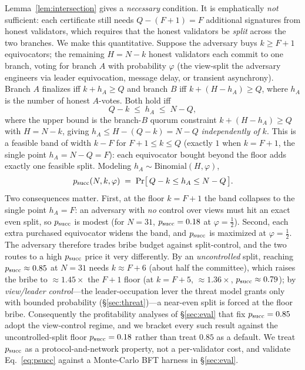 Lemma~\ref{lem:intersection} gives a \emph{necessary} condition. It is emphatically \emph{not}
sufficient: each certificate still needs $Q-(F{+}1)=F$ additional signatures from honest validators,
which requires that the honest validators be \emph{split} across the two branches. We make this
quantitative. Suppose the adversary buys $k\ge F+1$ equivocators; the remaining $H=N-k$ honest
validators each commit to one branch, voting for branch $A$ with probability $\varphi$ (the
view-split the adversary engineers via leader equivocation, message delay, or transient asynchrony).
Branch $A$ finalizes iff $k+h_A\ge Q$ and branch $B$ iff $k+(H-h_A)\ge Q$, where $h_A$ is the number
of honest $A$-votes. Both hold iff
\begin{equation}
Q-k \;\le\; h_A \;\le\; N-Q,
\label{eq:band}
\end{equation}
where the upper bound is the branch-$B$ quorum constraint $k+(H-h_A)\ge Q$ with $H=N-k$, giving
$h_A\le H-(Q{-}k)=N-Q$ \emph{independently of} $k$. This is a feasible band of width $k-F$ for
$F{+}1\le k\le Q$ (exactly $1$ when $k=F+1$, the single point $h_A=N-Q=F$): each equivocator bought
beyond the floor adds exactly one feasible split. Modeling $h_A\sim\mathrm{Binomial}(H,\varphi)$,
\begin{equation}
p_{\mathrm{succ}}(N,k,\varphi) \;=\; \Pr\!\big[\,Q-k \le h_A \le N-Q\,\big].
\label{eq:psucc}
\end{equation}
Two consequences matter. First, at the floor $k=F+1$ the band collapses to the single point
$h_A=F$: an adversary with \emph{no} control over views must hit an exact even split, so $p_{\mathrm{succ}}$ is
modest (for $N=31$, $p_{\mathrm{succ}}=0.18$ at $\varphi=\tfrac12$). Second, each extra purchased
equivocator widens the band, and $p_{\mathrm{succ}}$ is maximized at $\varphi=\tfrac12$. The adversary therefore
trades bribe budget against split-control, and the two routes to a high $p_{\mathrm{succ}}$ price it very
differently. By an \emph{uncontrolled} split, reaching $p_{\mathrm{succ}}\approx0.85$ at $N=31$ needs $k\approx
F{+}6$ (about half the committee), which raises the bribe to ${\approx}1.45\times$ the $F{+}1$ floor
(at $k{=}F{+}5$, ${\approx}1.36\times$, $p_{\mathrm{succ}}\approx0.79$);
by \emph{view/leader control}---the leader-occupation lever the threat model grants only with bounded
probability (\S\ref{sec:threat})---a near-even split is forced at the floor bribe. Consequently the
profitability analyses of \S\ref{sec:eval} that fix $p_{\mathrm{succ}}=0.85$ adopt the view-control regime, and we
bracket every such result against the uncontrolled-split floor $p_{\mathrm{succ}}=0.18$ rather than
treat $0.85$ as a default. We treat
$p_{\mathrm{succ}}$ as a protocol-and-network property, not a per-validator cost, and validate
Eq.~\eqref{eq:psucc} against a Monte-Carlo BFT harness in \S\ref{sec:eval}.

